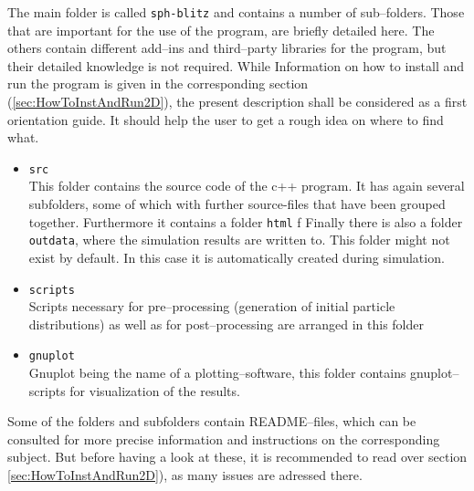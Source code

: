 \documentclass{report}
\begin{document}
The main folder is called {\tt sph-blitz} and contains a number of sub--folders. Those that are important for the use of the program, are briefly detailed here. The others contain different add--ins and third--party libraries for the program, but their detailed knowledge is not required.
While Information on how to install and run the program is given in the corresponding section (\ref{sec:HowToInstAndRun2D}), the present description shall be considered as a first orientation guide. It should help the user to get a rough idea on where to find what.
\begin{itemize}
 \item {\tt src}\\
This folder contains the source code of the c++ program. It has again several subfolders, some of which with further source-files that have been grouped together.
Furthermore it contains a folder {\tt html} f
Finally there is also a folder {\tt outdata}, where the simulation results are written to. This folder might not exist by default. In this case it is automatically created during simulation. 
\item {\tt scripts}\\
Scripts necessary for pre--processing (generation of initial particle distributions) as well as for post--processing  are arranged in this folder
\item{\tt gnuplot}\\
Gnuplot being the name of a plotting--software, this folder contains gnuplot--scripts for visualization of the results.

\end{itemize}
Some of the folders and subfolders contain README--files, which can be consulted for more precise information and instructions on the corresponding subject. But before having a look at these, it is recommended to read over section \ref{sec:HowToInstAndRun2D}), as many issues are adressed there.
\end{document}
